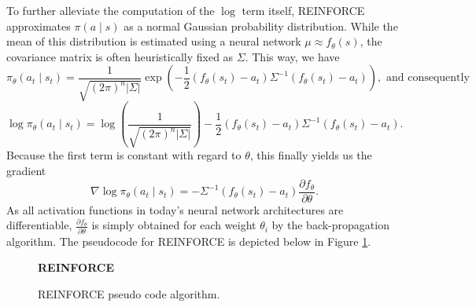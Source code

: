 \documentclass[a4paper, 11pt]{article}
\begin{document}
	To further alleviate the computation of the $\log$ term itself, REINFORCE approximates $\pi(a\mid s)$ as a normal Gaussian probability distribution. While the mean of this distribution is estimated using a neural network $\mu \approx f_\theta(s)$, the covariance matrix is often heuristically fixed as $\Sigma$.
	This way, we have
	\[\pi_\theta(a_t\mid s_t)=\frac{1}{\sqrt{(2\pi)^n|\Sigma|}}\exp\left(-\frac{1}{2}(f_{\theta}(s_t)-a_t)\Sigma^{-1}(f_{\theta}(s_t)-a_t)\right), \text{ and consequently}\]
	\[\log\pi_\theta(a_t\mid s_t)=\log\left(\frac{1}{\sqrt{(2\pi)^n|\Sigma|}}\right)  -\frac{1}{2}(f_{\theta}(s_t)-a_t)\Sigma^{-1}(f_{\theta}(s_t)-a_t).\]
	Because the first term is constant with regard to $\theta$, this finally yields us the gradient
	\[\nabla\log\pi_\theta(a_t\mid s_t)=-\Sigma^{-1}(f_{\theta}(s_t)-a_t)\frac{\partial f_\theta}{\partial \theta}.\]
	As all activation functions in today's neural network architectures are differentiable, $\frac{\partial f_\theta}{\partial \theta}$ is simply obtained for each weight $\theta_i$ by the back-propagation algorithm. The pseudocode for REINFORCE is depicted below in Figure \ref{fig:reinforce}.
	
	\begin{figure}[H]
		\begin{algorithm}[H]
			\caption{\textbf{REINFORCE}}
			\small %
			\raggedright
			\renewcommand{\algorithmicrequire}{\textbf{Initialize:}} %
			\begin{algorithmic}[1]
				\ENDFOR
				\ENDFOR
				\ENDWHILE
			\end{algorithmic}
		\end{algorithm}
		\caption{REINFORCE pseudo code algorithm.}
		\label{fig:reinforce}
	\end{figure}
	
\end{document}
